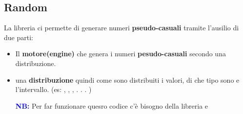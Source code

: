 \subsection{Random}
La libreria  ci permette di generare numeri \textbf{pseudo-casuali} tramite l'ausilio di due parti:
\begin{itemize}
    \item Il \textbf{motore(engine)} che genera i numeri \textbf{pesudo-casuali} secondo una distribuzione.
    \item una \textbf{distribuzione} quindi come sono distribuiti i valori, di che tipo sono e l'intervallo.  (es:
            , \newline
            ,\newline
            , . . . )\newline

    \begin{tcolorbox}[width=15cm, boxsep=10pt]
        
        \textbf{\textcolor{blue}{NB:}} Per far funzionare quesro codice c'è bisogno della libreria  e 
    \end{tcolorbox}
\end{itemize}

